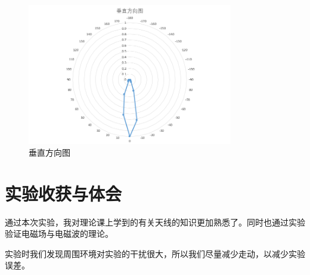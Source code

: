 \documentclass{../source/Experiment}
\begin{document}
        \begin{figure}[H]
            \centering
            \includegraphics[width = 0.8\textwidth]{pic/垂直.png}
            \caption{垂直方向图}
        \end{figure}


        \subsection{}

        \subsection{}


    \section{实验收获与体会}
        通过本次实验，我对理论课上学到的有关天线的知识更加熟悉了。同时也通过实验验证电磁场与电磁波的理论。

        实验时我们发现周围环境对实验的干扰很大，所以我们尽量减少走动，以减少实验误差。
\end{document}
